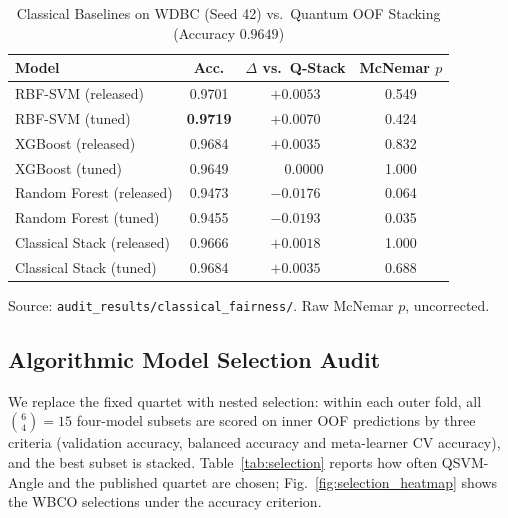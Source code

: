 \documentclass[journal,twocolumn]{IEEEtran}
\begin{document}
\begin{table}[!t]
\caption{Classical Baselines on WDBC (Seed 42) vs.\ Quantum OOF Stacking (Accuracy $0.9649$)}
\label{tab:fairness}
\centering
\scriptsize
\setlength{\tabcolsep}{3pt}
\renewcommand{\arraystretch}{1.12}
\begin{tabular}{lccc}
\toprule
\textbf{Model} & \textbf{Acc.} & \textbf{$\Delta$ vs.\ Q-Stack} & \textbf{McNemar $p$} \\
\midrule
RBF-SVM (released)          & 0.9701 & $+0.0053$ & 0.549 \\
RBF-SVM (tuned)             & \textbf{0.9719} & $+0.0070$ & 0.424 \\
XGBoost (released)          & 0.9684 & $+0.0035$ & 0.832 \\
XGBoost (tuned)             & 0.9649 & $\phantom{+}0.0000$ & 1.000 \\
Random Forest (released)    & 0.9473 & $-0.0176$ & 0.064 \\
Random Forest (tuned)       & 0.9455 & $-0.0193$ & 0.035 \\
Classical Stack (released) & 0.9666 & $+0.0018$ & 1.000 \\
Classical Stack (tuned)  & 0.9684 & $+0.0035$ & 0.688 \\
\bottomrule
\end{tabular}

\vspace{2pt}
{\tiny Source: \texttt{audit\_results/classical\_fairness/}. Raw McNemar $p$, uncorrected.\par}
\end{table}

\subsection{Algorithmic Model Selection Audit}
\label{sec:selection}

We replace the fixed quartet with nested selection: within each outer fold, all $\binom{6}{4}=15$ four-model subsets are scored on inner OOF predictions by three criteria (validation accuracy, balanced accuracy and meta-learner CV accuracy), and the best subset is stacked. Table~\ref{tab:selection} reports how often QSVM-Angle and the published quartet are chosen; Fig.~\ref{fig:selection_heatmap} shows the WBCO selections under the accuracy criterion.
\end{document}
